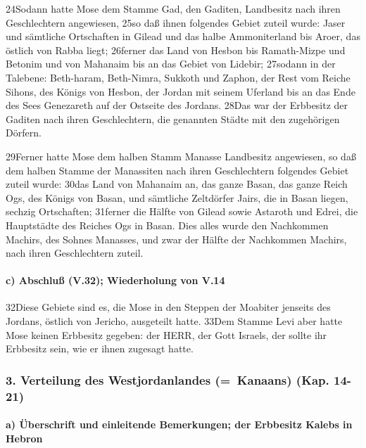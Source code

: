 24Sodann hatte Mose dem Stamme Gad, den Gaditen, Landbesitz nach ihren
Geschlechtern angewiesen, 25so daß ihnen folgendes Gebiet zuteil wurde:
Jaser und sämtliche Ortschaften in Gilead und das halbe Ammoniterland
bis Aroer, das östlich von Rabba liegt; 26ferner das Land von Hesbon bis
Ramath-Mizpe und Betonim und von Mahanaim bis an das Gebiet von Lidebir;
27sodann in der Talebene: Beth-haram, Beth-Nimra, Sukkoth und Zaphon,
der Rest vom Reiche Sihons, des Königs von Hesbon, der Jordan mit seinem
Uferland bis an das Ende des Sees Genezareth auf der Ostseite des
Jordans. 28Das war der Erbbesitz der Gaditen nach ihren Geschlechtern,
die genannten Städte mit den zugehörigen Dörfern.

29Ferner hatte Mose dem halben Stamm Manasse Landbesitz angewiesen, so
daß dem halben Stamme der Manassiten nach ihren Geschlechtern folgendes
Gebiet zuteil wurde: 30das Land von Mahanaim an, das ganze Basan, das
ganze Reich Ogs, des Königs von Basan, und sämtliche Zeltdörfer Jairs,
die in Basan liegen, sechzig Ortschaften; 31ferner die Hälfte von Gilead
sowie Astaroth und Edrei, die Hauptstädte des Reiches Ogs in Basan. Dies
alles wurde den Nachkommen Machirs, des Sohnes Manasses, und zwar der
Hälfte der Nachkommen Machirs, nach ihren Geschlechtern zuteil.

\hypertarget{c-abschluuxdf-v.32-wiederholung-von-v.14}{%
\paragraph{c) Abschluß (V.32); Wiederholung von
V.14}\label{c-abschluuxdf-v.32-wiederholung-von-v.14}}

32Diese Gebiete sind es, die Mose in den Steppen der Moabiter jenseits
des Jordans, östlich von Jericho, ausgeteilt hatte. 33Dem Stamme Levi
aber hatte Mose keinen Erbbesitz gegeben: der HERR, der Gott Israels,
der sollte ihr Erbbesitz sein, wie er ihnen zugesagt hatte.

\hypertarget{verteilung-des-westjordanlandes-kanaans-kap.-14-21}{%
\subsubsection{3. Verteilung des Westjordanlandes (=~Kanaans) (Kap.
14-21)}\label{verteilung-des-westjordanlandes-kanaans-kap.-14-21}}

\hypertarget{a-uxfcberschrift-und-einleitende-bemerkungen-der-erbbesitz-kalebs-in-hebron}{%
\paragraph{a) Überschrift und einleitende Bemerkungen; der Erbbesitz
Kalebs in
Hebron}\label{a-uxfcberschrift-und-einleitende-bemerkungen-der-erbbesitz-kalebs-in-hebron}}


